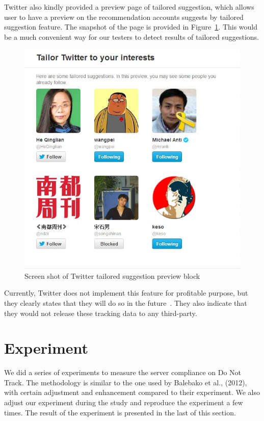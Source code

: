 \documentclass{sig-alternate}
\begin{document}
Twitter also kindly provided a preview page of tailored suggestion, which allows user to have a preview on the recommendation accounts suggests by tailored suggestion feature. The snapshot of the page is provided in Figure~\ref{fig:tailored}. This would be a much convenient way for our testers to detect results of tailored suggestions.

\begin{figure}
\begin{center}
\includegraphics[width=0.9\columnwidth]{tailored}
\end{center}
\caption{Screen shot of Twitter tailored suggestion preview block}
\label{fig:tailored}
\end{figure}


Currently, Twitter does not implement this feature for profitable purpose, but they clearly states that they will do so in the future~\cite{twitterfaq}. They also indicate that they would not release these tracking data to any third-party.

\section{Experiment} \label{sec:experiment}

We did a series of experiments to measure the server compliance on Do Not Track. The methodology is similar to the one used by Balebako et al., (2012), with certain adjustment and enhancement compared to their experiment. We also adjust our experiment during the study and reproduce the experiment a few times. The result of the experiment is presented in the last of this section.
\end{document}
